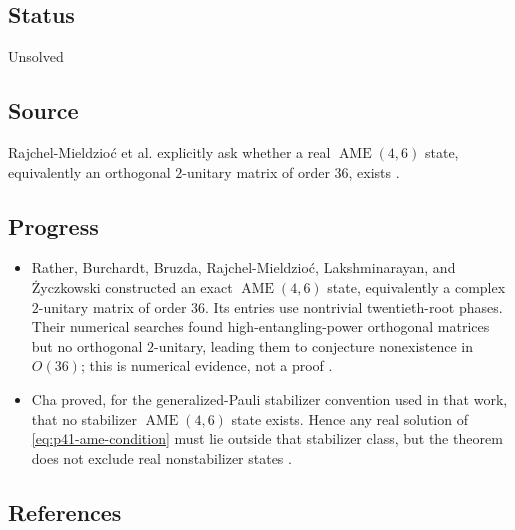 \subsection*{Status}

Unsolved

\subsection*{Source}

Rajchel-Mieldzio\'c et al. explicitly ask whether a real
$\operatorname{AME}(4,6)$ state, equivalently an orthogonal $2$-unitary
matrix of order $36$, exists .

\subsection*{Progress}

\begin{itemize}
  \item Rather, Burchardt, Bruzda, Rajchel-Mieldzio\'c, Lakshminarayan, and
  \.{Z}yczkowski constructed an exact
  $\operatorname{AME}(4,6)$ state, equivalently a complex $2$-unitary matrix
  of order $36$.  Its entries use nontrivial twentieth-root phases.  Their
  numerical searches found high-entangling-power orthogonal matrices but no
  orthogonal $2$-unitary, leading them to conjecture nonexistence in $O(36)$;
  this is numerical evidence, not a proof
  .

  \item Cha proved, for the generalized-Pauli stabilizer convention used in
  that work, that no stabilizer $\operatorname{AME}(4,6)$ state exists.
  Hence any real solution of \eqref{eq:p41-ame-condition} must lie outside
  that stabilizer class, but the theorem does not exclude real
  nonstabilizer states .
\end{itemize}

\subsection*{References}

